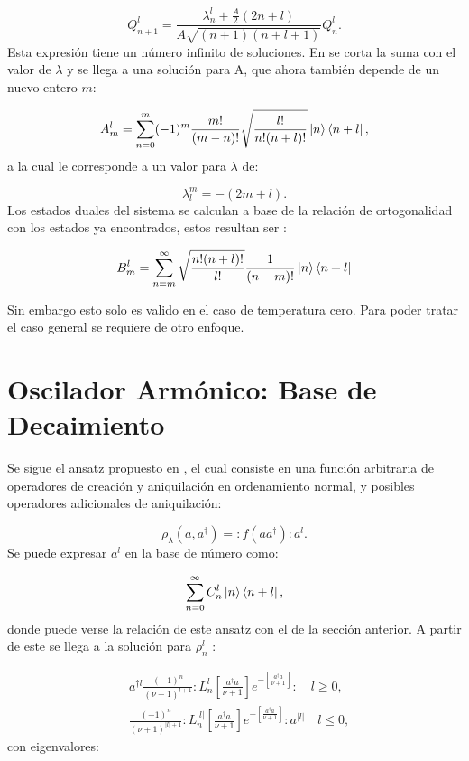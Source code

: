 \documentclass[a4paper,10pt]{report}
\begin{document}
\begin{equation}
Q_{n+1}^l = \frac{\lambda_n^l + \frac{A}{2}(2n+l)}{A\sqrt{(n+1)(n+l+1)}}Q_n^l.
\end{equation}Esta expresión tiene un número infinito de soluciones. En \cite{BarnettSD} se corta la suma con el valor de $\lambda$ y se llega a una solución para A, que ahora también depende de un nuevo entero $m$:

\begin{equation}
A_m^l = \sum_{n=0}^m (-1)^m \frac{m!}{(m-n)!}\sqrt{\frac{l!}{n!(n+l)!}}\Ket{n}\Bra{n+l},
\end{equation} a la cual le corresponde a un valor para $\lambda$ de:

\begin{equation}
\lambda_l^m = -(2m+l).
\end{equation} Los estados duales del sistema se calculan a base de la relación de ortogonalidad con los estados ya encontrados, estos resultan ser \cite{BarnettSD}:

\begin{equation}
B_m^l = \sum_{n=m}^\infty \sqrt{\frac{n!(n+l)!}{l!}}\frac{1}{(n-m)!}\Ket{n}\Bra{n+l}
\end{equation}

Sin embargo esto solo es valido en el caso de temperatura cero. Para poder tratar el caso general se requiere de otro enfoque.

\section{Oscilador Armónico: Base de Decaimiento}

Se sigue el ansatz propuesto en \cite{EnglertDB}, el cual consiste en una función arbitraria de operadores de creación y aniquilación en ordenamiento normal, y posibles operadores adicionales de aniquilación:

\begin{equation}\label{Englert1993}
\rho_\lambda (a,a^\dagger) = :f(aa^\dagger):a^l.
\end{equation} Se puede expresar $a^l$ en la base de número como:

\begin{equation}
\sum_{n=0}^\infty C_n^l\Ket{n}\Bra{n+l},
\end{equation} donde puede verse la relación de este ansatz con el de la sección anterior. A partir de este se llega a la solución para $\rho_n^l$ \cite{EnglertDB}:

\begin{align}\label{DefDB}
&a^{\dagger l}\frac{(-1)^n}{(\nu+1)^{l+1}}:L_n^l[\frac{a^\dagger a}{\nu+1}]e^{-[\frac{a^\dagger a}{\nu+1}]}:\quad l \geq 0, \\
&\frac{(-1)^n}{(\nu+1)^{|l|+1}}:L_n^{|l|}[\frac{a^\dagger a}{\nu+1}]e^{-[\frac{a^\dagger a}{\nu+1}]}:a^{|l|}\quad l \leq 0,
\end{align} con eigenvalores:
\end{document}

